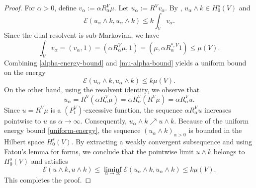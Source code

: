 \documentclass[11pt,a4paper,reqno]{amsart}
\theoremstyle{definition}
\numberwithin{equation}{section}
\begin{document}
\begin{proof}
For $\alpha > 0$, define $v_\alpha := \alpha R_\alpha^V \mu$. 
Let $u_\alpha := R^Vv_\alpha$. By  \cite[Theorem 4.2]{KR:CM}, $u_\alpha\wedge k  \in H_0^s(V)$ and
\begin{equation}\label{alpha-energy-bound}
    \mathcal{E}(u_\alpha\wedge k, u_\alpha\wedge k) \le k\int_Vv_\alpha.%
\end{equation}
Since the dual resolvent is sub-Markovian, we have
\begin{equation}\label{mu-alpha-bound}
\int_V v_\alpha=(v_\alpha,1)= (\alpha R_\alpha^V \mu,1)= (\mu,\alpha R^{*,V}_\alpha 1) \le\mu(V).
\end{equation}
Combining \eqref{alpha-energy-bound} and \eqref{mu-alpha-bound} yields a uniform bound on the energy
\begin{equation}\label{uniform-energy}
    \mathcal{E}(u_\alpha\wedge k, u_\alpha\wedge k) \le k \mu(V).
\end{equation}
On the other hand, using the resolvent identity, we observe that
\begin{equation*}
    u_\alpha = R^V (\alpha R_\alpha^V \mu) = \alpha R_\alpha^V (R^V \mu) = \alpha R_\alpha^V u.
\end{equation*}
Since $u = R^V \mu$ is a $(P^V_t)$-excessive function, the sequence $\alpha R_\alpha^V u$ increases pointwise to $u$ as $\alpha \to \infty$. Consequently, $u_\alpha\wedge k \nearrow u\wedge k$.
Because of the uniform energy bound \eqref{uniform-energy}, the sequence $(u_\alpha\wedge k)_{\alpha > 0}$
 is bounded in the Hilbert space $H_0^s(V)$. By extracting a weakly convergent subsequence and using 
Fatou's lemma for forms, we conclude that the pointwise limit $u\wedge k$ belongs to $H_0^s(V)$ and satisfies
\begin{equation*}
\mathcal{E}(u\wedge k, u\wedge k)\le\liminf_{\alpha \to \infty} \mathcal{E}(u_\alpha\wedge k, u_\alpha\wedge k)\le k\mu(V).
\end{equation*}
This completes the proof.
\end{proof}
\end{document}
